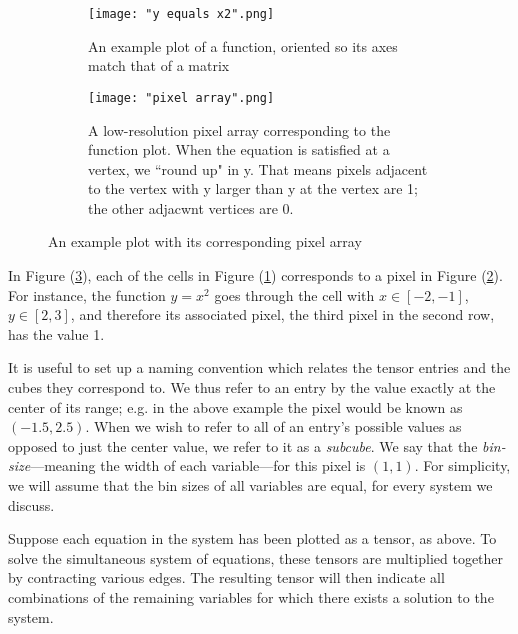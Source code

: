 \documentclass[11pt]{article}
\begin{document}
\begin{figure}[h]
\begin{subfigure}{.4\textwidth}
  \centering
  \captionsetup{width=0.8\textwidth}
  \texttt{[image: "y equals x2".png]}
  \caption{An example plot of a function, oriented so its axes match that of a matrix\\\vspace{.6in}}
  \label{sample_function}
\end{subfigure}%
\begin{subfigure}{.4\textwidth}
  \centering
  \captionsetup{width=0.84\textwidth}
  \texttt{[image: "pixel array".png]}
  \caption{A low-resolution pixel array corresponding to the function plot. When the equation is satisfied at a vertex, we ``round up" in y. That means pixels adjacent to the vertex with y larger than y at the vertex are 1; the other adjacwnt vertices are 0.}
  \label{sample_pixel_array}
\end{subfigure}%
\caption{An example plot with its corresponding pixel array}
\label{plot_and_pa}
\end{figure}

In Figure (\ref{plot_and_pa}), each of the cells in Figure (\ref{sample_function}) corresponds to a pixel in Figure (\ref{sample_pixel_array}). For instance, the function $y=x^2$ goes through the cell with $x \in [-2,-1]$, $y \in [2,3]$, and therefore its associated pixel, the third pixel in the second row, has the value 1.

It is useful to set up a naming convention which relates the tensor entries and the cubes they correspond to. We thus refer to an entry by the value exactly at the center of its range; e.g. in the above example the pixel would be known as $(-1.5, 2.5)$. When we wish to refer to all of an entry's possible values as opposed to just the center value, we refer to it as a \textit{subcube}. We say that the \textit{bin-size}---meaning the width of each variable---for this pixel is $(1,1)$. For simplicity, we will assume that the bin sizes of all variables are equal, for every system we discuss.

Suppose each equation in the system has been plotted as a tensor, as above. To solve the simultaneous system of equations, these tensors are multiplied together by contracting various edges. The resulting tensor will then indicate all combinations of the remaining variables for which there exists a solution to the system.
\end{document}
